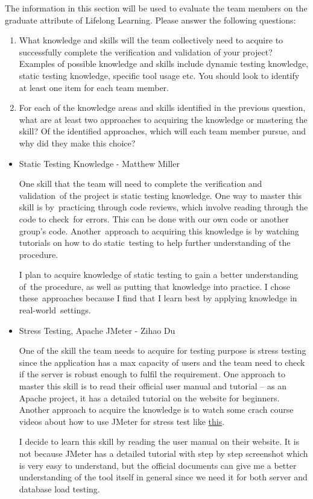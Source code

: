 \documentclass[12pt, titlepage]{article}
\begin{document}
The information in this section will be used to evaluate the team members on the
graduate attribute of Lifelong Learning.  Please answer the following questions:

\begin{enumerate}
  \item What knowledge and skills will the team collectively need to acquire to
  successfully complete the verification and validation of your project?
  Examples of possible knowledge and skills include dynamic testing knowledge,
  static testing knowledge, specific tool usage etc.  You should look to
  identify at least one item for each team member.
  \item For each of the knowledge areas and skills identified in the previous
  question, what are at least two approaches to acquiring the knowledge or
  mastering the skill?  Of the identified approaches, which will each team
  member pursue, and why did they make this choice?
\end{enumerate}

\begin{itemize}
	\item Static Testing Knowledge - Matthew Miller
	
	One skill that the team will need to complete the verification and validation\
	of the project is static testing knowledge. One way to master this skill is by\
	practicing through code reviews, which involve reading through the code to check\
	for errors. This can be done with our own code or another group's code. Another\
	approach to acquiring this knowledge is by watching tutorials on how to do static\
	testing to help further understanding of the procedure.

	I plan to acquire knowledge of static testing to gain a better understanding of\
	the procedure, as well as putting that knowledge into practice. I chose these\
	approaches because I find that I learn best by applying knowledge in real-world\
	settings.
	
	\item Stress Testing, Apache JMeter - Zihao Du
	
	One of the skill the team needs to acquire for testing purpose is stress testing since the application has a max capacity of users and the team need to check if the server is robust enough to fulfil the requirement. One approach to master this skill is to read their official user manual and tutorial -- as an Apache project, it has a detailed tutorial on the website for beginners. Another approach to acquire the knowledge is to watch some crach course videos about how to use JMeter for stress test like \href{https://www.youtube.com/watch?v=mXGcBvWYl-U}{this}. 
	
	I decide to learn this skill by reading the user manual on their website. It is not because JMeter has a detailed tutorial with step by step screenshot which is very easy to understand, but the official documents can give me a better understanding of the tool itself in general since we need it for both server and database load testing.

\end{itemize}
\end{document}
